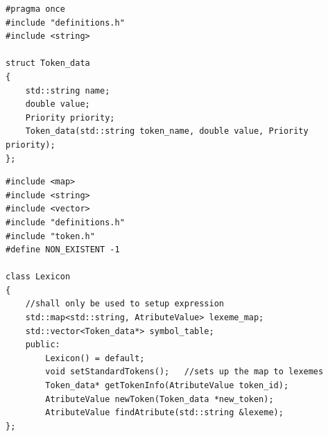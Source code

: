 \documentclass[14pt, letterpaper]{article}
\begin{document}
\begin{spacing}{3.5}
\end{spacing}

\begin{lstlisting}[caption=token.h]
#pragma once
#include "definitions.h"
#include <string>

struct Token_data
{
    std::string name;
    double value;
    Priority priority;
    Token_data(std::string token_name, double value, Priority priority);
};
\end{lstlisting}

\begin{spacing}{3.5}
\end{spacing}

\begin{lstlisting}[caption=lexicon.h]
#include <map>
#include <string>
#include <vector>
#include "definitions.h"
#include "token.h"
#define NON_EXISTENT -1

class Lexicon
{
    //shall only be used to setup expression
    std::map<std::string, AtributeValue> lexeme_map; 
    std::vector<Token_data*> symbol_table;
    public:
        Lexicon() = default;
        void setStandardTokens();   //sets up the map to lexemes
        Token_data* getTokenInfo(AtributeValue token_id); 
        AtributeValue newToken(Token_data *new_token);
        AtributeValue findAtribute(std::string &lexeme);
};
\end{lstlisting}

\begin{spacing}{3.5}
\end{spacing}
\end{document}
